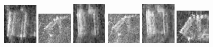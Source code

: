 \begin{figure}
    \includegraphics[width=0.15\textwidth]{chapters/images/dataset/all-class-images/can/can-194.jpg}
    \includegraphics[width=0.15\textwidth]{chapters/images/dataset/all-class-images/can/can-38.jpg}
    \includegraphics[width=0.15\textwidth]{chapters/images/dataset/all-class-images/can/can-87.jpg}
    \includegraphics[width=0.15\textwidth]{chapters/images/dataset/all-class-images/can/can-44.jpg}
    \includegraphics[width=0.15\textwidth]{chapters/images/dataset/all-class-images/can/can-92.jpg}
    \includegraphics[width=0.15\textwidth]{chapters/images/dataset/all-class-images/can/can-60.jpg}
    

\end{figure}
